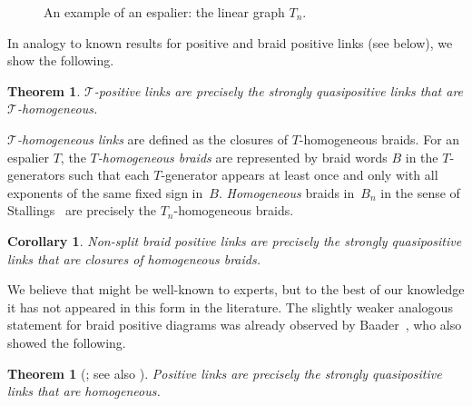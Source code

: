 \documentclass{amsart}
\theoremstyle{definition}
\theoremstyle{remark}
\theoremstyle{plain}
\newtheorem{theorem}[definition]{Theorem}%
\newtheorem{corollary}[definition]{Corollary}
\newcommand{\T}{\mathcal{T}}
\begin{document}
 \begin{figure}[htbp] 
     \centering
     \def\svgwidth{0,35\columnwidth}
	  
	\caption{An example of an espalier: the linear graph $T_n$.}
    \label{fig:espalierT_n}
\end{figure}
 
In analogy to known results for positive and braid positive links (see below), we show the following. 

\begin{theorem}\label{theorem:main_T-pos}
$\T$-positive links are precisely the strongly quasipositive links that are $\T$-homogeneous.
\end{theorem}

\emph{$\T$-homogeneous links} are defined as the closures of $T$-homogeneous braids. For an espalier $T$, the \emph{$T$-homogeneous braids} are represented by braid words $B$ in the $T$-generators such that each $T$-generator appears at least once and only with all exponents of the same fixed sign in~$B$. \emph{Homogeneous} braids in~$B_n$ in the sense of Stallings~\cite{stallings_1978} are precisely the $T_n$-homogeneous braids. %

\begin{corollary}\label{prop:braid_positive}
Non-split braid positive links are precisely the strongly quasipositive links that are closures of homogeneous braids. 
\end{corollary}

We believe that  %
might be well-known to experts, but to the best of our knowledge it has not appeared in this form in the literature. The slightly weaker analogous statement for braid positive diagrams was already observed by Baader~\cite[p.~287]{baader_pos}, who also showed the following.

\begin{theorem}[{\cite{baader_pos}; see also \cite{abe_homog,abe-tagami,FLL:almostpos}}]\label{theorem:pos_Seb}
Positive links are precisely the strongly quasipositive links that are homogeneous.
\end{theorem}
\end{document}
